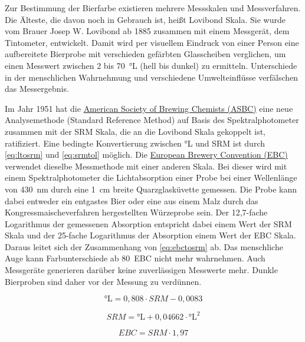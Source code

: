 \documentclass[a4paper,parskip=half]{scrartcl}
\newcommand{\EBC}{\mathit{EBC}}
\newcommand{\SRM}{\mathit{SRM}}
\begin{document}
Zur Bestimmung der Bierfarbe existieren mehrere Messskalen und Messverfahren. Die Älteste, die davon noch in Gebrauch ist, heißt Lovibond Skala. Sie wurde vom Brauer Josep W. Lovibond ab 1885 zusammen mit einem Messgerät, dem Tintometer, entwickelt. Damit wird per visuellem Eindruck von einer Person eine aufbereitete Bierprobe mit verschieden gefärbten Glasscheiben verglichen, um einen Messwert zwischen 2 bis 70~°L (hell bis dunkel) zu ermitteln. Unterschiede in der menschlichen Wahrnehmung und verschiedene Umwelteinflüsse verfälschen das Messergebnis. \parencites{KrausWeyermann2021a}{Shellhammer2009}

Im Jahr 1951 hat die \href{https://www.asbcnet.org}{American Society of Brewing Chemists (ASBC)} eine neue Analysemethode (Standard Reference Method) auf Basis des Spektralphotometer zusammen mit der SRM Skala, die an die Lovibond Skala gekoppelt ist, ratifiziert. Eine bedingte Konvertierung zwischen °L und SRM ist durch \autoref{eq:ltosrm} und \autoref{eq:srmtol} möglich. Die \href{https://europeanbreweryconvention.eu}{European Brewery Convention (EBC)} verwendet dieselbe Messmethode mit einer anderen Skala. Bei dieser wird mit einem Spektralphotometer die Lichtabsorption einer Probe bei einer Wellenlänge von 430~nm durch eine 1~cm breite Quarzglasküvette gemessen. Die Probe kann dabei entweder ein entgastes Bier oder eine aus einem Malz durch das Kongressmaischeverfahren hergestellten Würzeprobe sein. Der 12,7-fache Logarithmus der gemessenen Absorption entspricht dabei einem Wert der SRM Skala und der 25-fache Logarithmus der Absorption einem Wert der EBC Skala. Daraus leitet sich der Zusammenhang von \autoref{eq:ebctosrm} ab. Das menschliche Auge kann Farbunterschiede ab 80~EBC nicht mehr wahrnehmen. Auch Messgeräte generieren darüber keine zuverlässigen Messwerte mehr. Dunkle Bierproben sind daher vor der Messung zu verdünnen. \parencites{KrausWeyermann2021a}{Shellhammer2009}

\begin{equation}
\textrm{°L} = 0,808 \cdot \SRM - 0,0083
\label{eq:ltosrm}
\end{equation}

\begin{equation}
\SRM = \textrm{°L} + 0,04662 \cdot \textrm{°L}^2
\label{eq:srmtol}
\end{equation}

\begin{equation}
\EBC = \SRM \cdot 1,97
\label{eq:ebctosrm}
\end{equation}
\end{document}
